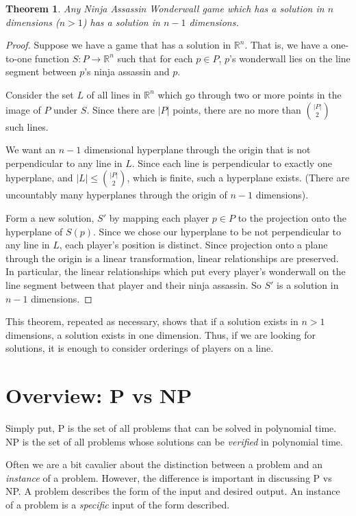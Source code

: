 \documentclass[12pt]{article}
\newtheorem*{thm}{Theorem}
\begin{document}
\begin{thm}
Any Ninja Assassin Wonderwall game which has a solution in $n$ dimensions ($n > 1$) has a solution in $n-1$ dimensions.
\end{thm}
\begin{proof}
Suppose we have a game that has a solution in $\mathbb{R}^n$. That is, we have a one-to-one function $S: P \to \mathbb{R}^n$ such that for each $p \in P$, $p$'s wonderwall lies on the line segment between $p$'s ninja assassin and $p$. 

Consider the set $L$ of all lines in $\mathbb{R}^n$ which go through two or more points in the image of $P$ under $S$. Since there are $\lvert P \rvert$ points, there are no more than $\binom{ \lvert P \rvert}{2}$ such lines. 

We want an $n-1$ dimensional hyperplane through the origin that is not perpendicular to any line in $L$. Since each line is perpendicular to exactly one hyperplane, and $\lvert L \rvert \leq \binom{\lvert P \rvert}{2}$, which is finite, such a hyperplane exists. (There are uncountably many hyperplanes through the origin of $n-1$ dimensions).

Form a new solution, $S'$ by mapping each player $p\in P$ to the projection onto the hyperplane of $S(p)$. Since we chose our hyperplane to be not perpendicular to any line in $L$, each player's position is distinct. Since projection onto a plane through the origin is a linear transformation, linear relationships are preserved. In particular, the linear relationships which put every player's wonderwall on the line segment between that player and their ninja assassin. So $S'$ is a solution in $n-1$ dimensions.
\end{proof}

This theorem, repeated as necessary, shows that if a solution exists in $n>1$ dimensions, a solution exists in one dimension. Thus, if we are looking for solutions, it is enough to consider orderings of players on a line.

\section{Overview: P vs NP}
Simply put, P is the set of all problems that can be solved in polynomial time. NP is the set of all problems whose solutions can be \emph{verified} in polynomial time. 

Often we are a bit cavalier about the distinction between a problem and an \emph{instance} of a problem. However, the difference is important in discussing P vs NP. A problem describes the form of the input and desired output. An instance of a problem is a \emph{specific} input of the form described. 
\end{document}
